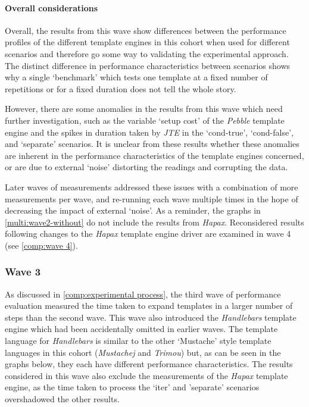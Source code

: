\paragraph{Overall considerations}

Overall, the results from this wave show differences between the performance profiles of the different template engines in this cohort when used for different scenarios and therefore go some way to validating the experimental approach. The distinct difference in performance characteristics between scenarios shows why a single `benchmark' which tests one template at a fixed number of repetitions or for a fixed duration \citep{Hasselbring2021} does not tell the whole story.

However, there are some anomalies in the results from this wave which need further investigation, such as the variable `setup cost' of the \emph{Pebble} template engine and the spikes in duration taken by \emph{JTE} in the `cond-true', `cond-false', and `separate' scenarios. It is unclear from these results whether these anomalies are inherent in the performance characteristics of the template engines concerned, or are due to external `noise' distorting the readings and corrupting the data.

Later waves of measurements addressed these issues with a combination of more measurements per wave, and re-running each wave multiple times in the hope of decreasing the impact of external `noise'. As a reminder, the graphs in \autoref{multi:wave2-without} do not include the results from \emph{Hapax}. Reconsidered results following changes to the \emph{Hapax} template engine driver are examined in wave 4 (see \autoref{comp:wave 4}).

\subsubsection{Wave 3}
\label{comp:wave 3}

As discussed in \autoref{comp:experimental process}, the third wave of performance evaluation measured the time taken to expand templates in a larger number of steps than the second wave. This wave also introduced the \emph{Handlebars} template engine which had been accidentally omitted in earlier waves. The template language for \emph{Handlebars} is similar to the other `Mustache' style template languages in this cohort (\emph{Mustachej} and \emph{Trimou}) but, as can be seen in the graphs below, they each have different performance characteristics. The results considered in this wave also exclude the measurements of the \emph{Hapax} template engine, as the time taken to process the `iter' and 'separate' scenarios  overshadowed the other results.

